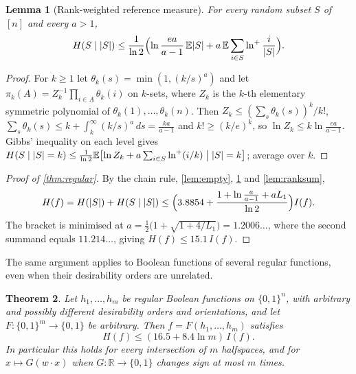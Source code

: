 \documentclass[11pt]{amsart}
\newtheorem{theorem}{Theorem}[section]
\newtheorem{lemma}[theorem]{Lemma}
\theoremstyle{definition}
\theoremstyle{remark}
\newcommand{\E}{\mathbb{E}}
\newcommand{\bits}{\{0,1\}}
\begin{document}
\begin{lemma}[Rank-weighted reference measure]\label{lem:rankref}
For every random subset $S$ of $[n]$ and every $a>1$,
\[
H(S\mid|S|)\le\frac1{\ln2}\Bigl(\ln\frac{ea}{a-1}\,\E|S|+a\,\E\sum_{i\in S}\ln^+\frac i{|S|}\Bigr).
\]
\end{lemma}

\begin{proof}
For $k\ge1$ let $\theta_k(s)=\min(1,(k/s)^a)$ and let $\pi_k(A)=Z_k^{-1}\prod_{i\in A}\theta_k(i)$ on $k$-sets,
where $Z_k$ is the $k$-th elementary symmetric polynomial of $\theta_k(1),\dots,\theta_k(n)$. Then
$Z_k\le(\sum_s\theta_k(s))^k/k!$, $\sum_s\theta_k(s)\le k+\int_k^\infty(k/s)^a\,ds=\frac{ka}{a-1}$ and
$k!\ge(k/e)^k$, so $\ln Z_k\le k\ln\frac{ea}{a-1}$. Gibbs' inequality on each level gives
$H(S\mid|S|=k)\le\frac1{\ln2}\E\bigl[\ln Z_k+a\sum_{i\in S}\ln^+(i/k)\bigm||S|=k\bigr]$; average over $k$.
\end{proof}

\begin{proof}[Proof of \cref{thm:regular}]
By the chain rule, \cref{lem:empty}, \cref{lem:rankref} and \cref{lem:ranksum},
\[
H(f)=H(|S|)+H(S\mid|S|)\le\Bigl(3.8854+\frac{1+\ln\frac a{a-1}+aL_1}{\ln2}\Bigr)I(f).
\]
The bracket is minimised at $a=\frac12\bigl(1+\sqrt{1+4/L_1}\bigr)=1.2006\ldots$, where the second summand equals
$11.214\ldots$, giving $H(f)\le15.1\,I(f)$.
\end{proof}

The same argument applies to Boolean functions of several regular functions, even when their desirability orders
are unrelated.

\begin{theorem}\label{thm:multi}
Let $h_1,\dots,h_m$ be regular Boolean functions on $\bits^n$, with arbitrary and possibly different desirability
orders and orientations, and let $F:\bits^m\to\bits$ be arbitrary. Then $f=F(h_1,\dots,h_m)$ satisfies
\[
H(f)\le(16.5+8.4\ln m)\,I(f).
\]
In particular this holds for every intersection of $m$ halfspaces, and for $x\mapsto G(w\cdot x)$ when
$G:\mathbb R\to\bits$ changes sign at most $m$ times.
\end{theorem}
\end{document}
